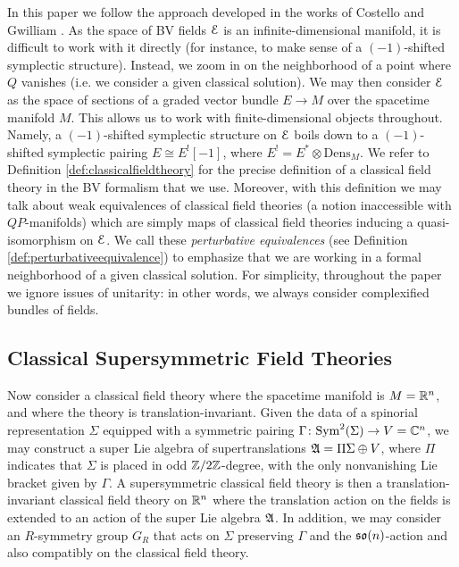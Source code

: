 \documentclass[10pt, oneside]{article}
\newcommand{\Dens}{\mathrm{Dens}}
\begin{document}
In this paper we follow the approach developed in the works of Costello and Gwilliam \cite{CostelloBook,Book1}. As the space of BV fields $\mathcal E$ is an infinite-dimensional manifold, it is difficult to work with it directly (for instance, to make sense of a $(-1)$-shifted symplectic structure). Instead, we zoom in on the neighborhood of a point where $Q$ vanishes (i.e. we consider a given classical solution). We may then consider $\mathcal E$ as the space of sections of a graded vector bundle $E\rightarrow M$ over the spacetime manifold $M$. This allows us to work with finite-dimensional objects throughout. Namely, a $(-1)$-shifted symplectic structure on $\mathcal E$ boils down to a $(-1)$-shifted symplectic pairing $E\cong E^![-1]$, where $E^!=E^*\otimes \Dens_M$. We refer to Definition \ref{def:classicalfieldtheory} for the precise definition of a classical field theory in the BV formalism that we use. Moreover, with this definition we may talk about weak equivalences of classical field theories (a notion inaccessible with $QP$-manifolds) which are simply maps of classical field theories inducing a quasi-isomorphism on $\mathcal E$. We call these \emph{perturbative equivalences} (see Definition \ref{def:perturbativeequivalence}) to emphasize that we are working in a formal neighborhood of a given classical solution. For simplicity, throughout the paper we ignore issues of unitarity: in other words, we always consider complexified bundles of fields.

\subsection*{Classical Supersymmetric Field Theories}

Now consider a classical field theory where the spacetime manifold is $M=\mathbb R^n$, and where the theory is translation-invariant. Given the data of a spinorial representation $\Sigma$ equipped with a symmetric pairing $\Gamma\colon{\rm Sym}^2(\Sigma)\rightarrow V=\mathbb C^n$, we may construct a super Lie algebra of supertranslations $\mathfrak A=\Pi\Sigma\oplus V$, where $\Pi$ indicates that $\Sigma$ is placed in odd $\mathbb Z/2\mathbb Z$-degree, with the only nonvanishing Lie bracket given by $\Gamma$. A supersymmetric classical field theory is then a translation-invariant classical field theory on $\mathbb R^n$ where the translation action on the fields is extended to an action of the super Lie algebra $\mathfrak A$. In addition, we may consider an $R$-symmetry group $G_R$ that acts on $\Sigma$ preserving $\Gamma$ and the $\mathfrak{so}(n)$-action and also compatibly on the classical field theory.
\end{document}
